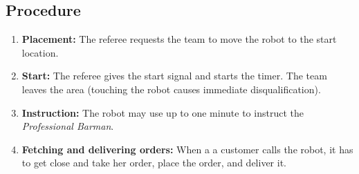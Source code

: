 \subsection{Procedure}
\begin{enumerate}[nosep]
	\item \textbf{Placement:} The referee requests the team to move the robot to the start location.
	\item \textbf{Start:} The referee gives the start signal and starts the timer. The team leaves the area (touching the robot causes immediate disqualification).
	\item \textbf{Instruction:} The robot may use up to one minute to instruct the \textit{Professional Barman}.
	\item \textbf{Fetching and delivering orders:} When a a customer calls the robot, it has to get close and take her order, place the order, and deliver it.
\end{enumerate}



